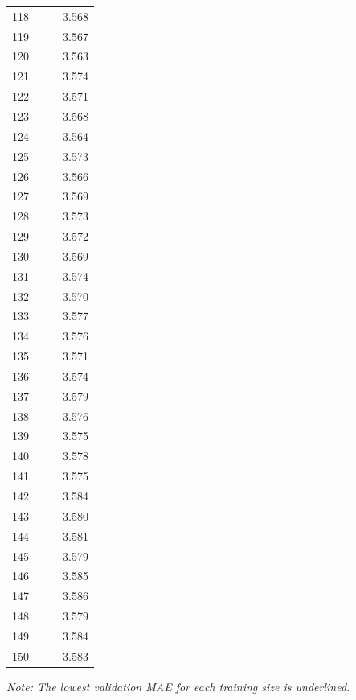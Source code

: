 \documentclass[12pt]{article}
\begin{document}
\begin{center}
\begin{tabular}{|l || l| l| l|}
            118 & & & 3.568 \\
            119 & & & 3.567 \\
            120 & & & 3.563 \\
            121 & & & 3.574 \\
            122 & & & 3.571 \\
            123 & & & 3.568 \\
            124 & & & 3.564 \\
            125 & & & 3.573 \\
            126 & & & 3.566 \\
            127 & & & 3.569 \\
            128 & & & 3.573 \\
            129 & & & 3.572 \\
            130 & & & 3.569 \\
            131 & & & 3.574 \\
            132 & & & 3.570 \\
            133 & & & 3.577 \\
            134 & & & 3.576 \\
            135 & & & 3.571 \\
            136 & & & 3.574 \\
            137 & & & 3.579 \\
            138 & & & 3.576 \\
            139 & & & 3.575 \\
            140 & & & 3.578 \\
            141 & & & 3.575 \\
            142 & & & 3.584 \\
            143 & & & 3.580 \\
            144 & & & 3.581 \\
            145 & & & 3.579 \\
            146 & & & 3.585 \\
            147 & & & 3.586 \\
            148 & & & 3.579 \\
            149 & & & 3.584 \\
            150 & & & 3.583 \\
            \hline
          \end{tabular}

          \textit{Note: The lowest validation MAE for each training size is underlined.}

          \normalsize


        \end{center}
\end{document}
